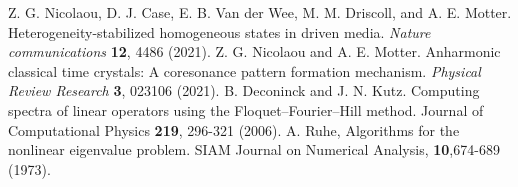 \documentclass[aps,pre,amsmath,amssymb,floatfix,onecolumn,notitlepage,10pt]{revtex4-1}
\begin{document}
\begin{thebibliography}{99}
 Z. G. Nicolaou, D. J. Case, E. B. Van der Wee, M. M. Driscoll, and A. E. Motter. Heterogeneity-stabilized homogeneous states in driven media. \textit{Nature communications} \textbf{12}, 4486 (2021).
 Z. G. Nicolaou and A. E. Motter. Anharmonic classical time crystals: A coresonance pattern formation mechanism. \textit{Physical Review Research} \textbf{3}, 023106 (2021).
B. Deconinck and J. N. Kutz. Computing spectra of linear operators using the Floquet–Fourier–Hill method. Journal of Computational Physics \textbf{219}, 296-321 (2006).
 A. Ruhe, Algorithms for the nonlinear eigenvalue problem. SIAM Journal on Numerical Analysis, \textbf{10},674-689 (1973).
\end{thebibliography}
\end{document}

